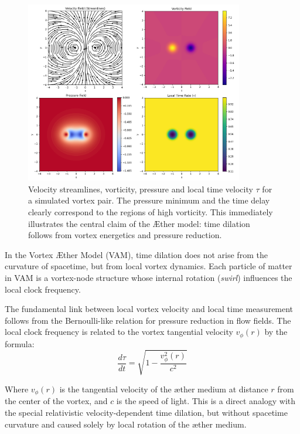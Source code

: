 \begin{figure}[htbp]
    \centering
    \includegraphics[width=0.85\textwidth]{01-streamlinesDiPole}
    \caption{Velocity streamlines, vorticity, pressure and local time velocity $\tau$ for a simulated vortex pair. The pressure minimum and the time delay clearly correspond to the regions of high vorticity. This immediately illustrates the central claim of the Æther model: time dilation follows from vortex energetics and pressure reduction.}
    \label{fig:vortexfields}
\end{figure}

In the Vortex Æther Model (VAM), time dilation does not arise from the curvature of spacetime, but from local vortex dynamics. Each particle of matter in VAM is a vortex-node structure whose internal rotation (\textit{swirl}) influences the local clock frequency.

The fundamental link between local vortex velocity and local time measurement follows from the Bernoulli-like relation for pressure reduction in flow fields. The local clock frequency is related to the vortex tangential velocity $v_{\phi}(r)$ by the formula:
\begin{equation}\label{eq:vortex_time_dilation}
\frac{d\tau}{dt} = \sqrt{1 - \frac{v_{\phi}^2(r)}{c^2}}
\end{equation}

Where $v_{\phi}(r)$ is the tangential velocity of the æther medium at distance $r$ from the center of the vortex, and $c$ is the speed of light. This is a direct analogy with the special relativistic velocity-dependent time dilation, but without spacetime curvature and caused solely by local rotation of the æther medium.

